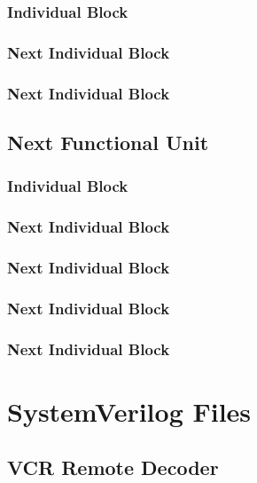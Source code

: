 \documentclass[a4paper]{article}
\makeatletter
\newcommand{\filecaption}[1]{\filename@parse{#1}\filename@base.\filename@ext}
\newcommand{\filelisting}[2][]{%
}
\makeatother
\begin{document}
\subsubsection{Individual Block}
\subsubsection{Next Individual Block}
\subsubsection{Next Individual Block}

\subsection{Next Functional Unit}
\subsubsection{Individual Block}
\subsubsection{Next Individual Block}
\subsubsection{Next Individual Block}
\subsubsection{Next Individual Block}
\subsubsection{Next Individual Block}

\appendix
\section{SystemVerilog Files}

\subsection{VCR Remote Decoder}
\filelisting{../verilog/vcr_remote/ir_decoder.sv}
\filelisting{../verilog/vcr_remote/ir_signal_transcriber.sv}
\newpage
\filelisting{../verilog/vcr_remote/sync_counter.sv}
\filelisting{../verilog/vcr_remote/counter.sv}
\filelisting{../verilog/vcr_remote/sync.sv}
\filelisting{../verilog/vcr_remote/shiftreg.sv}
\filelisting{../verilog/vcr_remote/checksum_validator.sv}
\filelisting{../verilog/vcr_remote/ir_code_decoder.sv}
\end{document}
